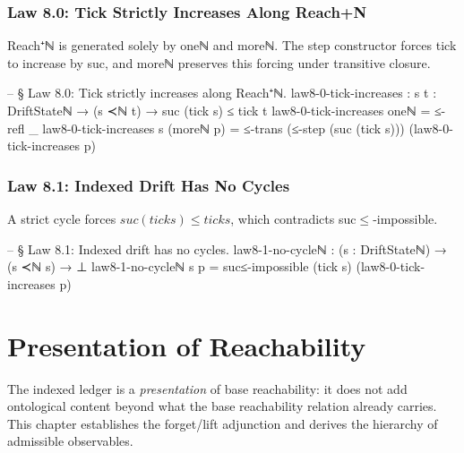 \documentclass[11pt,a4paper]{book}
\def\mathbb#1{#1}%
\def\texttt#1{#1}%
\def\texorpdfstring#1#2{#2}%
\begin{document}
\subsection{Law 8.0: Tick Strictly Increases Along Reach\texorpdfstring{$^+_{\mathbb{N}}$}{+N}}

\texttt{Reach⁺ℕ} is generated solely by \texttt{oneℕ} and \texttt{moreℕ}. The step constructor forces \texttt{tick} to increase by \texttt{suc}, and \texttt{moreℕ} preserves this forcing under transitive closure.

\begin{code}
-- § Law 8.0: Tick strictly increases along Reach⁺ℕ.
law8-0-tick-increases : {s t : DriftStateℕ} → (s ≺ℕ t) → suc (tick s) ≤ tick t
law8-0-tick-increases oneℕ = ≤-refl _
law8-0-tick-increases {s} (moreℕ p) =
  ≤-trans (≤-step (suc (tick s))) (law8-0-tick-increases p)
\end{code}

\subsection{Law 8.1: Indexed Drift Has No Cycles}

A strict cycle forces $\texttt{suc (tick s)} \le \texttt{tick s}$, which contradicts \texttt{suc$\le$-impossible}.

\begin{code}
-- § Law 8.1: Indexed drift has no cycles.
law8-1-no-cycleℕ : (s : DriftStateℕ) → (s ≺ℕ s) → ⊥
law8-1-no-cycleℕ s p = suc≤-impossible (tick s) (law8-0-tick-increases p)
\end{code}

\chapter{Presentation of Reachability}

The indexed ledger is a \emph{presentation} of base reachability: it does not add ontological content beyond what the base reachability relation already carries. This chapter establishes the forget/lift adjunction and derives the hierarchy of admissible observables.
\end{document}
